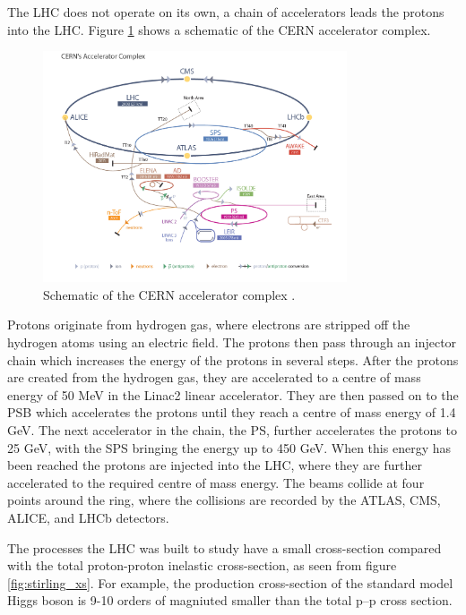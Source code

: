 The \ac{LHC} does not operate on its own, a chain of accelerators leads
the protons into the \ac{LHC}. Figure \ref{fig:lhc_schematic} shows a schematic
of the \ac{CERN} accelerator complex.
\begin{figure}[h!]
\includegraphics[width=0.8\textwidth]{./Detector/Plots/LHC_default.jpg}
\caption{Schematic of the \ac{CERN} accelerator complex \cite{lhc-schematic}.}
\label{fig:lhc_schematic}
\end{figure}
Protons originate from hydrogen gas, where electrons are stripped off the 
hydrogen atoms using an electric field. The protons then pass through an injector
chain which increases the energy of the protons in several steps. After the protons
are created from the hydrogen gas, they are accelerated to a centre of mass energy of
50 MeV in the Linac2 linear accelerator. They are then passed on to the
\acf{PSB} which accelerates the protons until they reach a centre of mass energy of 1.4 GeV.
The next accelerator in the chain, the \acf{PS}, further accelerates the protons to 25 GeV,
with the \acf{SPS} bringing the energy up to 450 GeV. When this energy has been 
reached the protons are injected into the \ac{LHC}, where they are further accelerated to 
the required centre of mass energy. The beams collide at four points
around the ring, where the collisions are recorded by the ATLAS, CMS, ALICE, and LHCb detectors.

The processes the \ac{LHC} was built to study have a small cross-section
compared with the total proton-proton inelastic cross-section, as seen from figure
\ref{fig:stirling_xs}. For example, the production cross-section of the
standard model Higgs boson is 9-10 orders of magniuted smaller than the total p--p cross section.

